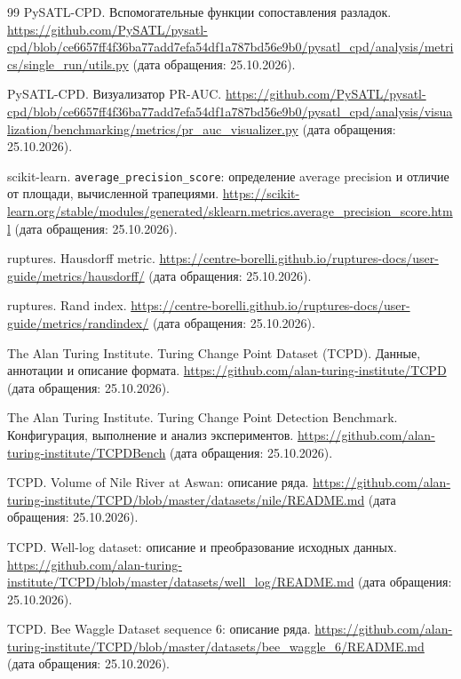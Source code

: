 \begin{thebibliography}{99}
PySATL-CPD. Вспомогательные функции сопоставления разладок.
\url{https://github.com/PySATL/pysatl-cpd/blob/ce6657ff4f36ba77add7efa54df1a787bd56e9b0/pysatl_cpd/analysis/metrics/single_run/utils.py}
(дата обращения: 25.10.2026).

PySATL-CPD. Визуализатор PR-AUC.
\url{https://github.com/PySATL/pysatl-cpd/blob/ce6657ff4f36ba77add7efa54df1a787bd56e9b0/pysatl_cpd/analysis/visualization/benchmarking/metrics/pr_auc_visualizer.py}
(дата обращения: 25.10.2026).

scikit-learn. \texttt{average\_precision\_score}:
определение average precision и отличие от площади, вычисленной трапециями.
\url{https://scikit-learn.org/stable/modules/generated/sklearn.metrics.average_precision_score.html}
(дата обращения: 25.10.2026).

ruptures. Hausdorff metric.
\url{https://centre-borelli.github.io/ruptures-docs/user-guide/metrics/hausdorff/}
(дата обращения: 25.10.2026).

ruptures. Rand index.
\url{https://centre-borelli.github.io/ruptures-docs/user-guide/metrics/randindex/}
(дата обращения: 25.10.2026).

The Alan Turing Institute. Turing Change Point Dataset (TCPD).
Данные, аннотации и описание формата.
\url{https://github.com/alan-turing-institute/TCPD}
(дата обращения: 25.10.2026).

The Alan Turing Institute. Turing Change Point Detection Benchmark.
Конфигурация, выполнение и анализ экспериментов.
\url{https://github.com/alan-turing-institute/TCPDBench}
(дата обращения: 25.10.2026).

TCPD. Volume of Nile River at Aswan: описание ряда.
\url{https://github.com/alan-turing-institute/TCPD/blob/master/datasets/nile/README.md}
(дата обращения: 25.10.2026).

TCPD. Well-log dataset: описание и преобразование исходных данных.
\url{https://github.com/alan-turing-institute/TCPD/blob/master/datasets/well_log/README.md}
(дата обращения: 25.10.2026).

TCPD. Bee Waggle Dataset sequence 6: описание ряда.
\url{https://github.com/alan-turing-institute/TCPD/blob/master/datasets/bee_waggle_6/README.md}
(дата обращения: 25.10.2026).

\end{thebibliography}
